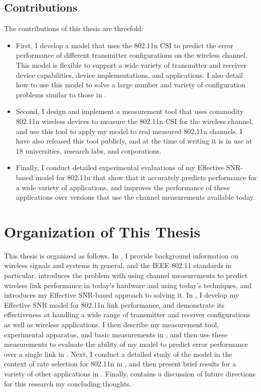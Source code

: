 \subsection{Contributions}
\label{sec:intro_contributions}

The contributions of this thesis are threefold:
\begin{itemize}
\item First, I develop a model that uses the 802.11n CSI to predict the error performance of different transmitter configurations on the wireless channel. This model is flexible to support a wide variety of transmitter and receiver device capabilities, device implementations, and applications. I also detail how to use this model to solve a large number and variety of configuration problems similar to those in .
\item Second, I design and implement a measurement tool that uses commodity 802.11n wireless devices to measure the 802.11n CSI for the wireless channel, and use this tool to apply my model to real measured 802.11n channels. I have also released this tool publicly, and at the time of writing it is in use at 18 universities, research labs, and corporations.
\item Finally, I conduct detailed experimental evaluations of my Effective SNR-based model for 802.11n that show that it accurately predicts performance for a wide variety of applications, and improves the performance of these applications over versions that use the channel measurements available today.
\end{itemize}

\section{Organization of This Thesis}
\label{sec:intro_organization}
This thesis is organized as follows. In , I provide background information on wireless signals and systems in general, and the IEEE 802.11 standards in particular.  introduces the problem with using channel measurements to predict wireless link performance in today's hardware and using today's techniques, and introduces my Effective SNR-based approach to solving it. In , I develop my Effective SNR model for 802.11n link performance, and demonstrate its effectiveness at handling a wide range of transmitter and receiver configurations as well as wireless applications. I then describe my measurement tool, experimental apparatus, and basic measurements in , and then use these measurements to evaluate the ability of my model to predict error performance over a single link in . Next, I conduct a detailed study of the model in the context of rate selection for 802.11n in , and then present brief results for a variety of other applications in . Finally,  contains a discussion of future directions for this research my concluding thoughts.

\ifx\mainfile\undefined

\fi
